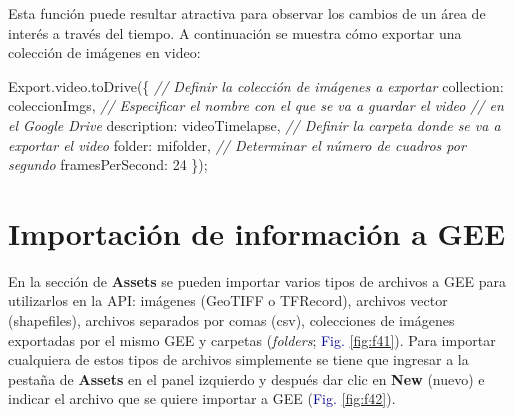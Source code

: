 \documentclass[
  12pt,
  letterpaper,
  twoside]{book}
\newenvironment{Shaded}{\begin{snugshade}}{\end{snugshade}}
\newcommand{\AttributeTok}[1]{\textcolor[rgb]{0.48,0.12,0.64}{#1}}
\newcommand{\CommentTok}[1]{\textcolor[rgb]{0.24,0.58,0.00}{\textit{#1}}}
\newcommand{\DataTypeTok}[1]{\textcolor[rgb]{0.00,0.00,0.00}{#1}}
\newcommand{\DecValTok}[1]{\textcolor[rgb]{0.28,0.53,0.93}{#1}}
\newcommand{\FunctionTok}[1]{\textcolor[rgb]{0.48,0.12,0.64}{#1}}
\newcommand{\NormalTok}[1]{#1}
\newcommand{\OperatorTok}[1]{\textcolor[rgb]{0.00,0.00,0.00}{#1}}
\newcommand{\StringTok}[1]{\textcolor[rgb]{0.87,0.29,0.22}{#1}}
\begin{document}
Esta función puede resultar atractiva para observar los cambios de un área de interés a través del tiempo. A continuación se muestra cómo exportar una colección de imágenes en video:

\begin{Shaded}
\begin{Highlighting}[]
\NormalTok{Export}\OperatorTok{.}\AttributeTok{video}\OperatorTok{.}\FunctionTok{toDrive}\NormalTok{(\{}
  \CommentTok{// Definir la colección de imágenes a exportar}
  \DataTypeTok{collection}\OperatorTok{:}\NormalTok{ coleccionImgs}\OperatorTok{,}
  \CommentTok{// Especificar el nombre con el que se va a guardar el video}
  \CommentTok{// en el Google Drive}
  \DataTypeTok{description}\OperatorTok{:} \StringTok{\textquotesingle{}videoTimelapse\textquotesingle{}}\OperatorTok{,}
  \CommentTok{// Definir la carpeta donde se va a exportar el video}
  \DataTypeTok{folder}\OperatorTok{:} \StringTok{\textquotesingle{}mifolder\textquotesingle{}}\OperatorTok{,}
  \CommentTok{// Determinar el número de cuadros por segundo}
  \DataTypeTok{framesPerSecond}\OperatorTok{:} \DecValTok{24}
\NormalTok{ \})}\OperatorTok{;}
\end{Highlighting}
\end{Shaded}

\newpage

\hypertarget{importaciuxf3n-de-informaciuxf3n-a-gee}{%
\chapter{Importación de información a GEE}\label{importaciuxf3n-de-informaciuxf3n-a-gee}}

En la sección de \textbf{Assets} se pueden importar varios tipos de archivos a GEE para utilizarlos en la API: imágenes (GeoTIFF o TFRecord), archivos vector (shapefiles), archivos separados por comas (csv), colecciones de imágenes exportadas por el mismo GEE y carpetas (\emph{folders}; \textcolor{darkblue}{Fig.} \ref{fig:f41}). Para importar cualquiera de estos tipos de archivos simplemente se tiene que ingresar a la pestaña de \textbf{Assets} en el panel izquierdo y después dar clic en \textbf{New} (nuevo) e indicar el archivo que se quiere importar a GEE (\textcolor{darkblue}{Fig.} \ref{fig:f42}).
\end{document}
